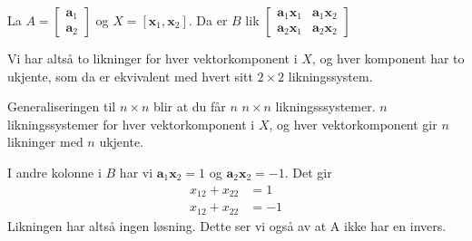 \documentclass[11pt, a4paper, norsk]{NTNUoving}
\begin{document}
\begin{oppgave}[3]
    \begin{punkt}
        La $A = \begin{bmatrix} \textbf{a}_1\\ \textbf{a}_2 \end{bmatrix}$ og $X = [\textbf{x}_1, \textbf{x}_2]$. Da er $B$ lik
        $\begin{bmatrix} \textbf{a}_1\textbf{x}_1 & \textbf{a}_1\textbf{x}_2 \\ \textbf{a}_2\textbf{x}_1 & \textbf{a}_2\textbf{x}_2 \end{bmatrix}$
        
        Vi har altså to likninger for hver vektorkomponent i $X$, og hver komponent har to ukjente, som da er ekvivalent med hvert sitt $2\times 2$ likningssystem. 
        
        Generaliseringen til $n\times n$ blir at du får $n$ $n\times n$ likningsssystemer. $n$ likningssystemer for hver vektorkomponent i $X$, og hver vektorkomponent gir $n$ likninger med $n$ ukjente.
    \end{punkt}
    
    \begin{punkt}
        I andre kolonne i $B$ har vi  $\textbf{a}_1\textbf{x}_2 = 1$ og $\textbf{a}_2\textbf{x}_2 = -1$. Det gir
        \begin{align*}
            x_{12}+x_{22}&=1\\
            x_{12}+x_{22}&=-1
        \end{align*}
        Likningen har altså ingen løsning. Dette ser vi også av at A ikke har en invers. 
    \end{punkt}
\end{oppgave}
\end{document}
